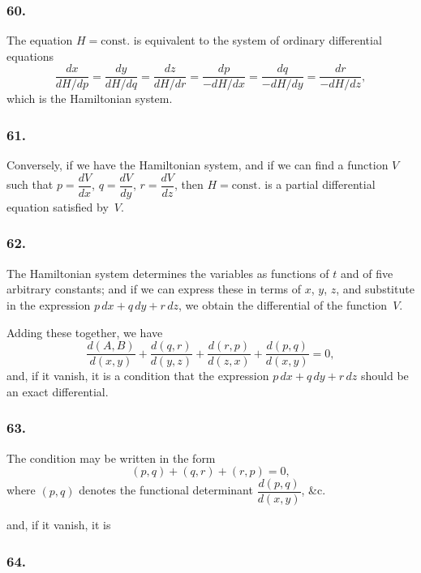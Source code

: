 \documentclass[12pt,a4paper]{article}
\theoremstyle{plain}
\begin{document}
\newpage
\setcounter{page}{139}

\subsubsection*{60.}

The equation $H = \text{const.}$ is equivalent to the system of ordinary differential equations
\[
\frac{dx}{dH/dp} = \frac{dy}{dH/dq} = \frac{dz}{dH/dr} = \frac{dp}{-dH/dx} = \frac{dq}{-dH/dy} = \frac{dr}{-dH/dz},
\]
which is the Hamiltonian system.

\subsubsection*{61.}

Conversely, if we have the Hamiltonian system, and if we can find a function $V$ such that $p = \dfrac{dV}{dx}$, $q = \dfrac{dV}{dy}$, $r = \dfrac{dV}{dz}$, then $H = \text{const.}$ is a partial differential equation satisfied by~$V$.

\subsubsection*{62.}

The Hamiltonian system determines the variables as functions of $t$ and of five arbitrary constants; and if we can express these in terms of $x$, $y$, $z$, and substitute in the expression $p\,dx + q\,dy + r\,dz$, we obtain the differential of the function~$V$.

\newpage
\setcounter{page}{140}

Adding these together, we have
\[
\frac{d(A, B)}{d(x, y)} + \frac{d(q, r)}{d(y, z)} + \frac{d(r, p)}{d(z, x)} + \frac{d(p, q)}{d(x, y)} = 0,
\]
and, if it vanish, it is a condition that the expression $p\,dx + q\,dy + r\,dz$ should be an exact differential.

\subsubsection*{63.}

The condition may be written in the form
\[
(p, q) + (q, r) + (r, p) = 0,
\]
where $(p, q)$ denotes the functional determinant $\dfrac{d(p, q)}{d(x, y)}$, \&c.

\newpage
\setcounter{page}{141}

and, if it vanish, it is

\subsubsection*{64.}
\end{document}
